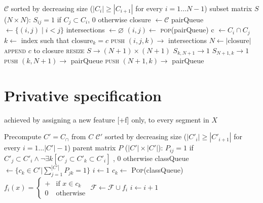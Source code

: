 \documentclass[11pt, oneside]{article}   	%
\begin{document}
\vspace{\baselineskip} \noindent \begin{algorithmic}
    \REQUIRE $\mathcal C$ sorted by decreasing size ($|C_i| \geq |C_{i+1}| $ for every $i = 1 \ldots N-1$)
    \REQUIRE subset matrix $S$ ($N \times N$): $S_{ij} = 1$ if $C_j \subset C_i$, $0$ otherwise
    \STATE
    \STATE closure $\leftarrow \mathcal C$
    \STATE pairQueue $\leftarrow \{ (i, j) \; | \; i < j \}$
    \STATE intersections $\leftarrow \varnothing$
    \STATE
        \STATE $(i, j) \leftarrow$ \textsc{pop}(pairQueue)
            \STATE c $\leftarrow C_i \cap C_j$
                \STATE $k \leftarrow$ index such that $\text{closure}_k = c$
                \STATE \textsc{push} $(i, j, k) \rightarrow$ intersections
                \STATE $N \leftarrow |\text{closure}|$
                \STATE \textsc{append} $c$ to closure
                \STATE \textsc{resize} $S \rightarrow (N+1) \times (N+1)$
                        \STATE $S_{k,N+1} \rightarrow 1$
                    \ENDIF
                     \STATE $S_{N+1,k} \rightarrow 1$ \ENDIF
                    \STATE \textsc{push} $(k, N+1) \rightarrow$ pairQueue
                    \STATE \textsc{push} $(N+1,k) \rightarrow$ pairQueue
                \ENDFOR
            \ENDIF
        \ENDIF
    \ENDWHILE
\end{algorithmic}

\section{Privative specification}
achieved by assigning a new feature [+f] only, to every segment in $X$

\vspace{\baselineskip} \noindent \begin{algorithmic}
	\REQUIRE Precompute $C' = C_\cap$ from $C$
	\REQUIRE $\mathcal C'$ sorted by decreasing size ($|C'_i| \geq |C'_{i+1}| $ for every $i = 1 \ldots |C'|-1$)
	\REQUIRE parent matrix $P$ ($|C'| \times |C'|$): $P_{ij} = 1$ if $C'_j \subset C'_i \land \neg \exists k [C'_j \subset C'_k \subset C'_i]$ , $0$ otherwise
	\STATE
	\STATE classQueue $\leftarrow \{c_k \in C' | \sum_{j=1}^{|C'|}P_{jk} = 1 \}$
	\STATE $i \leftarrow 1$
	\STATE
	\STATE $c_k \leftarrow$ \textsc{Pop}(classQueue)
	\STATE $f_i(x) = \begin{cases}
		+ & \mbox{if } x \in c_k \\
		0 & \mbox{otherwise}
		\end{cases} $
	\STATE $\mathcal F \leftarrow \mathcal F \cup f_i$
	\STATE $i \leftarrow i + 1$
	\ENDWHILE
\end{algorithmic}
\end{document}
